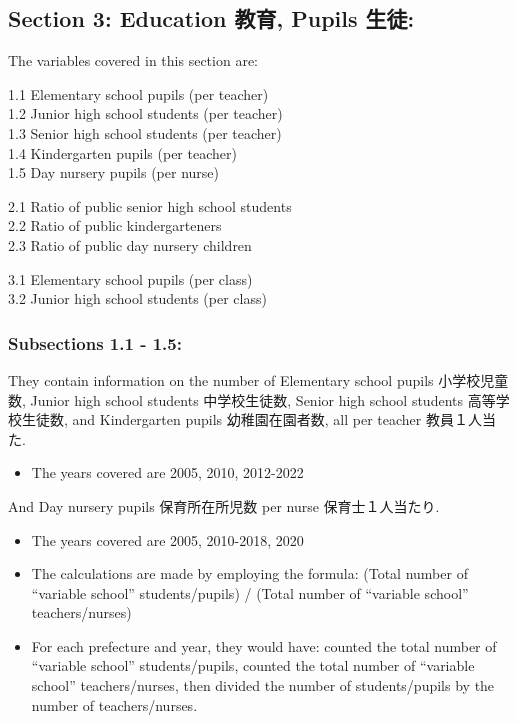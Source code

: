 \documentclass[
]{ltjarticle}
\providecommand{\tightlist}{%
  \setlength{\itemsep}{0pt}\setlength{\parskip}{0pt}}\usepackage{longtable,booktabs,array}
\begin{document}
\hypertarget{section-3-education-ux6559ux80b2-pupils-ux751fux5f92}{%
\subsection{Section 3: Education 教育, Pupils
生徒:}\label{section-3-education-ux6559ux80b2-pupils-ux751fux5f92}}

The variables covered in this section are:

1.1 Elementary school pupils (per teacher)\\
1.2 Junior high school students (per teacher)\\
1.3 Senior high school students (per teacher)\\
1.4 Kindergarten pupils (per teacher)\\
1.5 Day nursery pupils (per nurse)

2.1 Ratio of public senior high school students\\
2.2 Ratio of public kindergarteners\\
2.3 Ratio of public day nursery children

3.1 Elementary school pupils (per class)\\
3.2 Junior high school students (per class)

\hypertarget{subsections-1.1---1.5}{%
\subsubsection{Subsections 1.1 - 1.5:}\label{subsections-1.1---1.5}}

They contain information on the number of Elementary school pupils
小学校児童数, Junior high school students 中学校生徒数, Senior high
school students 高等学校生徒数, and Kindergarten pupils 幼稚園在園者数,
all per teacher 教員１人当た.

\begin{itemize}
\tightlist
\item
  The years covered are 2005, 2010, 2012-2022
\end{itemize}

And Day nursery pupils 保育所在所児数 per nurse 保育士１人当たり.

\begin{itemize}
\item
  The years covered are 2005, 2010-2018, 2020
\item
  The calculations are made by employing the formula: (Total number of
  ``variable school'' students/pupils) / (Total number of ``variable
  school'' teachers/nurses)
\item
  For each prefecture and year, they would have: counted the total
  number of ``variable school'' students/pupils, counted the total
  number of ``variable school'' teachers/nurses, then divided the number
  of students/pupils by the number of teachers/nurses.
\end{itemize}
\end{document}
